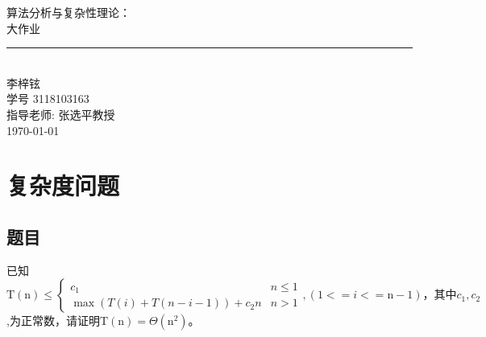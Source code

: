 \documentclass[UTF8]{ctexart}
\newcommand{\labtitle}{大作业}
\newcommand{\authorname}{李梓铉}
\newcommand{\professor}{张选平教授}
\newcommand{\classno}{3118103163}
\begin{document}


\begin{titlepage}
\begin{center}
{\LARGE \textsc{算法分析与复杂性理论：} \\ \vspace{4pt}}
{\Large \textsc{\labtitle} \\ \vspace{4pt}}
\rule[13pt]{\textwidth}{1pt} \\ \vspace{150pt}
{\large  \authorname \\ \vspace{10pt}
学号 \classno\\ \vspace{10pt}
指导老师: \professor \\ \vspace{10pt}
\today}
\end{center}
\end{titlepage}





\section{复杂度问题}
\subsection{题目}

已知$\mathrm{T}(\mathrm{n}) \leq \left\{\begin{array}{cl}{c_{1}} & {n \leq 1} \\ {\max (T(i)+T(n-i-1))+c_{2} n} & {n>1}\end{array}\right.,(1<=i<=\mathrm{n}-1)
，其中c_{1},c_{2}$,为正常数，请证明$\mathrm{T}(\mathrm{n})=\Theta\left(\mathrm{n}^{2}\right)$。
\vspace{3mm}
\end{document}
